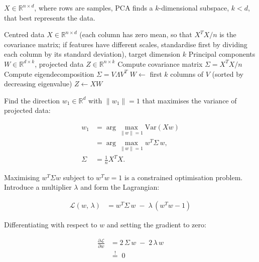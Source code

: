 





 $X \in \mathbb{R}^{n \times d}$, where rows are samples, PCA finds a $k$-dimensional subspace, $k < d$, that best represents the data.

\begin{algorithm}[H]
\caption{PCA via Eigendecomposition}
\begin{algorithmic}[1]
\Require Centred data $X \in \mathbb{R}^{n \times d}$ (each column has zero mean, so that $X^T X / n$ is the covariance matrix; if features have different scales, standardise first by dividing each column by its standard deviation), target dimension $k$
\Ensure Principal components $W \in \mathbb{R}^{d \times k}$, projected data $Z \in \mathbb{R}^{n \times k}$
\State Compute covariance matrix $\Sigma = X^T X / n$
\State Compute eigendecomposition $\Sigma = V \Lambda V^T$
\State $W \gets$ first $k$ columns of $V$ (sorted by decreasing eigenvalue)
\State $Z \gets X W$ 
\end{algorithmic}
\end{algorithm}

Find the direction $w_1 \in \mathbb{R}^d$ with $\|w_1\|{=}1$ that maximises the variance of projected data:

\begin{align*}
    w_1 &= \arg\max_{\|w\|=1} \text{Var}(Xw) \\
        &= \arg\max_{\|w\|=1} w^T \Sigma\, w, \\
    \Sigma &= \tfrac{1}{n} X^T X.
\end{align*}

Maximising $w^T \Sigma w$ subject to $w^T w = 1$ is a constrained optimisation problem.
Introduce a multiplier $\lambda$ and form the Lagrangian:

\begin{align*}
    \mathcal{L}(w,\, \lambda) &= w^T \Sigma\, w \;-\; \lambda\,(w^T w - 1)
\end{align*}

Differentiating with respect to $w$ and setting the gradient to zero:

\begin{align*}
    \frac{\partial \mathcal{L}}{\partial w}
        &= 2\,\Sigma\, w \;-\; 2\,\lambda\, w \\
        &\stackrel{!}{=}\; 0
\end{align*}

